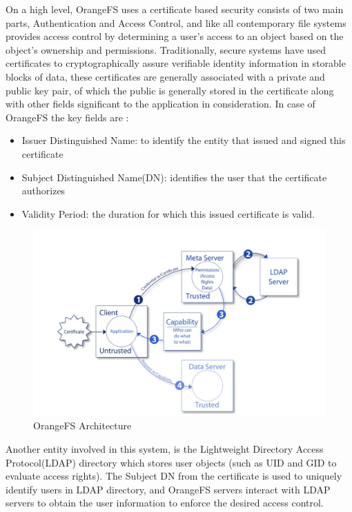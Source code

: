 On a high level, OrangeFS uses a certificate based security consists of two main parts, Authentication and Access Control, and like all contemporary file systems provides access control by determining a user's access to an object based on the object's ownership and permissions. Traditionally, secure systems have used certificates to cryptographically assure verifiable identity information in storable blocks of data, these certificates are generally associated with a private and public key pair, of which the public is generally stored in the certificate along with other fields significant to the application in consideration. In case of OrangeFS the key fields are :
\begin{itemize}
\item Issuer Distinguished Name: to identify the entity that issued and signed this certificate
\item Subject Distinguished Name(DN): identifies the user that the certificate authorizes
\item Validity Period: the duration for which this issued certificate is valid.
\end{itemize} 

\begin{figure}[h]
\centering
\includegraphics[scale = 0.2]{img/orange}
\caption{OrangeFS Architecture}
\label{orange}
\end{figure}

Another entity involved in this system, is the Lightweight Directory Access Protocol(LDAP) directory which stores user objects (such as UID and GID to evaluate access rights). The Subject DN from the certificate is used to uniquely identify users in LDAP directory, and OrangeFS servers interact with LDAP servers to obtain the user information to enforce the desired access control. 


